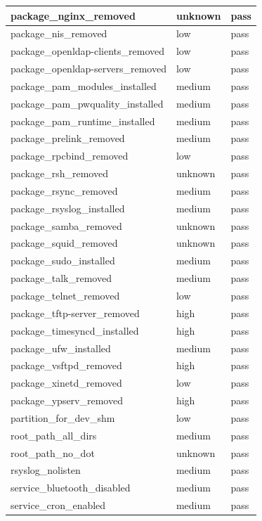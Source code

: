 \begin{longtable}{|p{10cm}|p{2cm}|p{2cm}|}
\hline
package\_nginx\_removed & unknown & pass \\
\hline
package\_nis\_removed & low & pass \\
\hline
package\_openldap-clients\_removed & low & pass \\
\hline
package\_openldap-servers\_removed & low & pass \\
\hline
package\_pam\_modules\_installed & medium & pass \\
\hline
package\_pam\_pwquality\_installed & medium & pass \\
\hline
package\_pam\_runtime\_installed & medium & pass \\
\hline
package\_prelink\_removed & medium & pass \\
\hline
package\_rpcbind\_removed & low & pass \\
\hline
package\_rsh\_removed & unknown & pass \\
\hline
package\_rsync\_removed & medium & pass \\
\hline
package\_rsyslog\_installed & medium & pass \\
\hline
package\_samba\_removed & unknown & pass \\
\hline
package\_squid\_removed & unknown & pass \\
\hline
package\_sudo\_installed & medium & pass \\
\hline
package\_talk\_removed & medium & pass \\
\hline
package\_telnet\_removed & low & pass \\
\hline
package\_tftp-server\_removed & high & pass \\
\hline
package\_timesyncd\_installed & high & pass \\
\hline
package\_ufw\_installed & medium & pass \\
\hline
package\_vsftpd\_removed & high & pass \\
\hline
package\_xinetd\_removed & low & pass \\
\hline
package\_ypserv\_removed & high & pass \\
\hline
partition\_for\_dev\_shm & low & pass \\
\hline
root\_path\_all\_dirs & medium & pass \\
\hline
root\_path\_no\_dot & unknown & pass \\
\hline
rsyslog\_nolisten & medium & pass \\
\hline
service\_bluetooth\_disabled & medium & pass \\
\hline
service\_cron\_enabled & medium & pass \\

\end{longtable}
